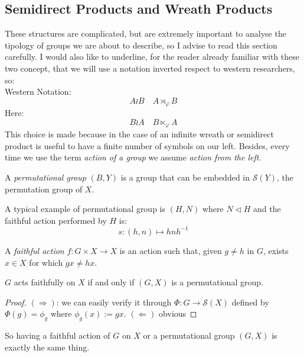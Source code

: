 \documentclass[mat1]{fmfdeloTS}
\begin{document}
\bigskip
\bigskip
\bigskip
\subsection{Semidirect Products and Wreath Products}
These structures are complicated, but are extremely important to analyse the tipology of groups we are about to describe, so I advise to read this section carefully.
I would also like to underline, for the reader already familiar with these two concept, that we will use a notation inverted respect to western researchers, so:
\\Western Notation: $$A \wr B\quad A \rtimes_{\varphi}B$$
Here: $$B \wr A\quad B\ltimes_{\varphi}A$$
This choice is made because in the case of an infinite wreath or semidirect product is useful to have a finite number of symbols on our left.
Besides, every time we use the term \textit{action of a group} we assume \textit{action from the left}.



\begin{definition}
A \textit{permutational group} $(B,Y)$ is a group that can be embedded in $\mathcal{S} (Y)$, the permutation group of $X$.
\end{definition}

\begin{example}
\label{ex.1}
A typical example of permutational group is $(H,N)$ where $N\triangleleft H$ and the faithful action performed by $H$ is:
$$s:(h,n)\longmapsto hnh^{-1}$$
\end{example}


\begin{definition}
A \textit{faithful action} $f: G\times X\longrightarrow X$ is an action such that, given $g\neq h$ in $G$, exists $x\in X$ for which $gx\neq hx$.
\end{definition}
\begin{proposition}
$G$ acts faithfully on $X$ if and only if $(G,X)$ is a permutational group.
\end{proposition}
\begin{proof}
$(\Rightarrow)$: we can easily verify it through $\Phi:G\longrightarrow \mathcal{S}(X)$ defined by $\Phi(g)=\phi_g$ where $\phi_g(x):=gx$.
$(\Leftarrow)$ obvious
\end{proof}

So having a faithful action of $G$ on $X$ or a permutational group $(G,X)$ is exactly the same thing.
\end{document}
